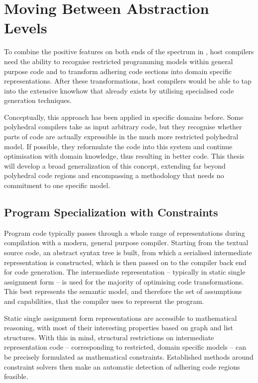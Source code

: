 \section{Moving Between Abstraction Levels}

    To combine the positive features on both ends of the spectrum in
    , host compilers need the ability to recognise
    restricted programming models within general purpose code and to transform
    adhering code sections into domain specific representations.
    After these transformations, host compilers would be able to tap into the
    extensive knowhow that already exists by utilising specialised code
    generation techniques.

    Conceptually, this approach has been applied in specific domains before.
    Some polyhedral compilers take as input arbitrary code, but they recognise
    whether parts of code are actually expressible in the much more restricted
    polyhedral model.
    If possible, they reformulate the code into this system and continue
    optimisation with domain knowledge, thus resulting in better code.
    This thesis will develop a broad generalization of this concept, extending
    far beyond polyhedral code regions and encompassing a methodology that
    needs no commitment to one specific model.

\subsection{Program Specialization with Constraints}

    Program code typically passes through a whole range of representations
    during compilation with a modern, general purpose compiler.
    Starting from the textual source code, an abstract syntax tree is built,
    from which a serialised intermediate representation is constructed,
    which is then passed on to the compiler back end for code generation.
    The intermediate representation -- typically in static single assignment
    form -- is used for the majority of optimising code transformations.
    This best represents the semantic model, and therefore the set of
    assumptions and capabilities, that the compiler uses to represent the
    program.

    Static single assignment form representations are accessible to mathematical
    reasoning, with most of their interesting properties based on graph and list
    structures.
    With this in mind, structural restrictions on intermediate representation
    code -- corresponding to restricted, domain specific models -- can be
    precisely formulated as mathematical constraints.
    Established methods around constraint solvers then make an automatic
    detection of adhering code regions feasible.

